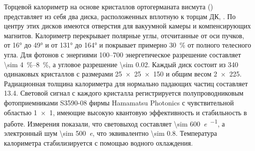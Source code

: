 Торцевой калориметр на основе кристаллов ортогерманата висмута  () представляет из себя два диска, расположенных вплотную к торцам ДК, \cite{BGOAkhmetshin2009}.
По центру этих дисков имеются отверстия для вакуумной камеры и компенсирующих магнитов.
Калориметр перекрывает полярные углы,
отсчитанные от оси пучков,
от \ang{16} до \ang{49} и от \ang{131} до \ang{164} и покрывает примерно \SI{30}{\percent} от полного телесного угла.
Для фотонов с энергиями 
\SIrange[range-phrase = --, range-units = single]{100}{700}{\MeVr}
энергетическое разрешение составляет 
\SIrange[range-phrase = --, range-units = single]{\sim 4}{8}{\percent},
а угловое разрешение \SI{\sim 0.02}{\radianru}.
Каждый диск состоит из \num{340} одинаковых кристаллов с размерами
\SI[product-units = power]{25 x 25 x 150}{\mmr}
и общим весом
\SI[product-units = single]{2 x 225}{\kgr}. 
Радиационная толщина калориметра для нормально падающих частиц составляет \SI{13.4}{\Xrad}.
Световой сигнал с каждого кристалла регистрируется полупроводниковым фотоприемниками S3590-08 фирмы Hamamatsu Photonics
с чувствительной областью \SI[product-units = power]{1 x 1}{\cmr},
имеющие высокую квантовую эффективность и стабильность в работе. 
Измерения показали,
что световыход составляет \SI{\sim 600}{\elementarycharge\per\MeVr},
а электронный шум \SI{\sim 500}{\elementarycharge},
что эквивалентно \SI{\sim 0.8}{\MeVr}.
Температура калориметра стабилизируется с помощью водного охлаждения.




%



